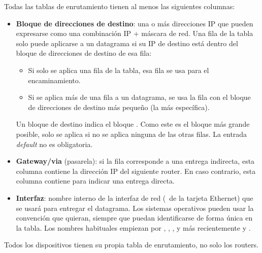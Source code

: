 Todas las tablas de enrutamiento tienen al menos las siguientes columnas:
\begin{itemize}
\item \textbf{Bloque de direcciones de destino}: una o más direcciones IP que pueden expresarse como una combinación IP + máscara de red.
  Una fila de la tabla solo puede aplicarse a un datagrama si su IP de destino está dentro del bloque de direcciones de destino de esa fila:
  \begin{itemize}
  \item Si solo se aplica una fila de la tabla, esa fila se usa para el encaminamiento.
  \item Si se aplica más de una fila a un datagrama, se usa la fila con el bloque de direcciones de destino más pequeño 
    (la más específica).
  \end{itemize}
  Un bloque de destino  indica el bloque .
  Como este es el bloque más grande posible, solo se aplica si no se aplica ninguna de las otras filas. 
  La entrada \textit{default} no es obligatoria.\\[-0.3cm]
  
\item \textbf{Gateway/via} (pasarela): si la fila corresponde a una entrega indirecta, esta columna contiene la dirección IP
  del siguiente router. En caso contrario, esta columna contiene  para indicar una entrega directa.\\[-0.3cm]
  
\item \textbf{Interfaz}: nombre interno de la interfaz de red (\eg\ de la tarjeta Ethernet) que se usará para entregar el 
  datagrama. Los sistemas operativos pueden usar la convención que quieran, siempre que puedan identificarse de forma única en la tabla.
  Los nombres habituales empiezan por , , , 
  y más recientemente  y .
\end{itemize}

\begin{remark}
Todos los dispositivos tienen su propia tabla de enrutamiento, no solo los routers.
\end{remark}

